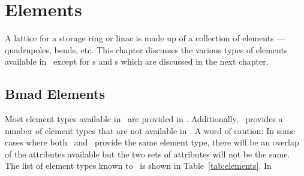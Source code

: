 \chapter{Elements}

A lattice for a storage ring or linac is made up of a collection of
elements --- quadrupoles, bends, etc. This chapter discusses the
various types of elements available in \bmad\ except for s
and s which are discussed in the next chapter.

\section{Bmad Elements}

Most element types available in \mad\ are provided in \bmad.
Additionally, \bmad\ provides a number of element types that are not
available in \mad.  A word of caution: In some cases where both \mad\
and \bmad\ provide the same element type, there will be an overlap of 
the attributes available but the two sets of attributes will not be the same.
The list of element types known to \bmad\ is shown in Table~\ref{tab:elements}.
In

